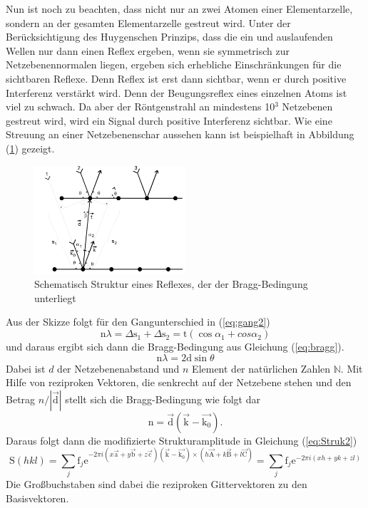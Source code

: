 Nun ist noch zu beachten, dass nicht nur an zwei Atomen einer Elementarzelle, sondern an der gesamten Elementarzelle gestreut wird. 
Unter der Berücksichtigung des Huygenschen Prinzips, dass die ein und auslaufenden Wellen nur dann einen Reflex ergeben, wenn sie symmetrisch zur Netzebenennormalen liegen, ergeben sich erhebliche Einschränkungen für die sichtbaren Reflexe.
Denn Reflex ist erst dann sichtbar, wenn er durch positive Interferenz verstärkt wird. Denn der Beugungsreflex eines einzelnen Atoms ist viel zu schwach.
Da aber der Röntgenstrahl an mindestens 10$^3$ Netzebenen gestreut wird, wird ein Signal durch positive Interferenz sichtbar.
Wie eine Streuung an einer Netzebenenschar aussehen kann ist beispielhaft in Abbildung (\ref{fig:bragg}) gezeigt.
\begin{figure}[h]
	\centering
	\includegraphics[width = 0.5\textwidth]{Abbildungen/bragg}
	\caption{Schematisch Struktur eines Reflexes, der der Bragg-Bedingung unterliegt}
	\label{fig:bragg}
\end{figure}
Aus der Skizze folgt für den Gangunterschied in (\ref{eq:gang2}) 
\begin{equation}
\text{n} \lambda = \Delta \text{s}_1+\Delta \text{s}_2 = \text{t}(\cos{\alpha_1}+cos{\alpha_2})
\label{eq:gang2}
\end{equation}
und daraus ergibt sich dann die Bragg-Bedingung aus Gleichung (\ref{eq:bragg}).
\begin{equation}
\text{n}\lambda = 2 \text{d} \sin{\theta}
\label{eq:bragg}
\end{equation}
Dabei ist $d$ der Netzebenenabstand und $n$ Element der natürlichen Zahlen $\mathbb{N}$.
Mit Hilfe von reziproken Vektoren, die senkrecht auf der Netzebene stehen und den Betrag $n/|\vec{\text{d}}|$ stellt sich die Bragg-Bedingung wie folgt dar
\begin{equation}
 \text{n} = \vec{ \text{d}}(\vec{ \text{k}}-\vec{ \text{k}_0}).
\end{equation}
Daraus folgt dann die modifizierte Strukturamplitude in Gleichung (\ref{eq:Struk2})
\begin{equation}
\text{S}(hkl) = \sum_j \text{f}_j \text{e}^{-2\pi i (x\vec{\text{a}}+y \vec{\text{b}}+ z \vec{\text{c}}) (\vec{\text{k}}-\vec{\text{k}_0})\times (h\vec{\text{A}}+k\vec{\text{B}}+ l\vec{\text{C}}) } = \sum_j \text{f}_j \text{e}^{-2\pi i (xh+y k+ z l) }
\label{eq:Struk2}
\end{equation}
Die Großbuchstaben sind dabei die reziproken Gittervektoren zu den Basisvektoren.
